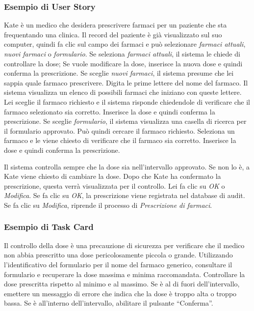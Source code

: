 \subsubsection{Esempio di User Story}
\begin{tcolorbox}[title ={Prescrizione}]
    Kate è un medico che desidera prescrivere farmaci per un paziente che sta
    frequentando una clinica. Il record del paziente è già visualizzato sul suo
    computer, quindi fa clic sul campo dei farmaci e può selezionare \textit{farmaci attuali},
    \textit{nuovi farmaci} o \textit{formulario}.
    Se seleziona \textit{farmaci attuali}, il sistema le chiede di controllare la dose;
    Se vuole modificare la dose, inserisce la nuova dose e quindi conferma la prescrizione.
    Se sceglie \textit{nuovi farmaci}, il sistema presume che lei sappia quale farmaco
    prescrivere. Digita le prime lettere del nome del farmaco. Il sistema visualizza un
    elenco di possibili farmaci che iniziano con queste lettere. Lei sceglie il farmaco
    richiesto e il sistema risponde chiedendole di verificare che il farmaco selezionato
    sia corretto. Inserisce la dose e quindi conferma la prescrizione.
    Se sceglie \textit{formulario}, il sistema visualizza una casella di ricerca per
    il formulario approvato. Può quindi cercare il farmaco richiesto. Seleziona un farmaco
    e le viene chiesto di verificare che il farmaco sia corretto. Inserisce la dose e
    quindi conferma la prescrizione.

    Il sistema controlla sempre che la dose sia nell'intervallo approvato. Se non lo è,
    a Kate viene chiesto di cambiare la dose.
    Dopo che Kate ha confermato la prescrizione, questa verrà visualizzata per il controllo.
    Lei fa clic su \textit{OK} o \textit{Modifica}. Se fa clic su \textit{OK},
    la prescrizione viene registrata nel database di audit. Se fa clic su \textit{Modifica},
    riprende il processo di \textit{Prescrizione di farmaci}.
    
\end{tcolorbox}

\subsubsection{Esempio di Task Card}
\begin{tcolorbox}[title ={Task 1: Controllo della dose}]
Il controllo della dose è una precauzione di sicurezza per verificare che il medico
non abbia prescritto una dose pericolosamente piccola o grande.
Utilizzando l'identificativo del formulario per il nome del farmaco generico,
consultare il formulario e recuperare la dose massima e minima raccomandata.
Controllare la dose prescritta rispetto al minimo e al massimo. Se è al di fuori
dell'intervallo, emettere un messaggio di errore che indica che la dose è troppo
alta o troppo bassa. Se è all'interno dell'intervallo, abilitare il pulsante ``Conferma''.
\end{tcolorbox}

